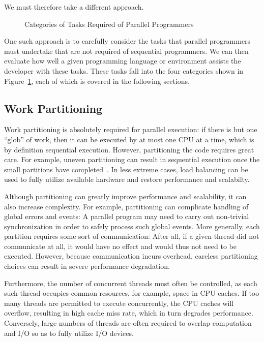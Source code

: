We must therefore take a different approach.

\begin{figure}[tb]
\begin{center}
\end{center}
\caption{Categories of Tasks Required of Parallel Programmers}
\label{fig:intro:Categories of Tasks Required of Parallel Programmers}
\end{figure}

One such approach is to carefully consider the tasks that parallel
programmers must undertake that are not required of sequential programmers.
We can then evaluate how well a given programming language or environment
assists the developer with these tasks.
These tasks fall into the four categories shown in
Figure~\ref{fig:intro:Categories of Tasks Required of Parallel Programmers},
each of which is covered in the following sections.

\subsection{Work Partitioning}
\label{sec:intro:Work Partitioning}

Work partitioning is absolutely required for parallel execution:
if there is but one ``glob'' of work, then it can be executed by at
most one CPU at a time, which is by definition sequential execution.
However, partitioning the code requires great care.
For example, uneven partitioning can result in sequential execution
once the small partitions have completed~\cite{GeneAmdahl1967AmdahlsLaw}.
In less extreme cases, load balancing can be used to fully utilize
available hardware and restore performance and scalabilty.

Although partitioning can greatly improve performance and scalability,
it can also increase complexity.
For example, partitioning can complicate handling of global
errors and events: A parallel
program may need to carry out non-trivial synchronization in order
to safely process such global events.
More generally, each partition requires some sort of communication:
After all, if
a given thread did not communicate at all, it would have no effect and
would thus not need to be executed.
However, because communication incurs overhead, careless partitioning choices
can result in severe performance degradation.

Furthermore, the number of concurrent threads must often be controlled,
as each such thread occupies common resources, for example,
space in CPU caches.
If too many threads are permitted to execute concurrently, the
CPU caches will overflow, resulting in high cache miss rate, which in
turn degrades performance.
Conversely, large numbers of threads are often required to
overlap computation and I/O so as to fully utilize I/O devices.

